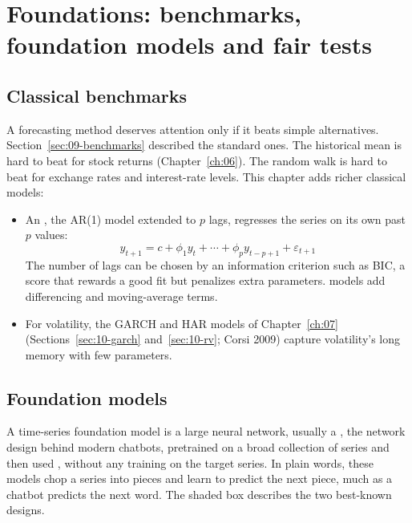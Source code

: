 \section{Foundations: benchmarks, foundation models and fair tests}
\label{sec:21-foundations}

\subsection{Classical benchmarks}

A forecasting method deserves attention only if it beats simple alternatives. Section~\ref{sec:09-benchmarks} described the standard ones. The historical mean is hard to beat for stock returns (Chapter~\ref{ch:06}). The random walk is hard to beat for exchange rates and interest-rate levels. This chapter adds richer classical models:
\begin{itemize}
  \item An , the AR(1) model extended to $p$ lags, regresses the series on its own past $p$ values:
  \begin{equation}
    y_{t+1} = c + \phi_1 y_t + \cdots + \phi_p y_{t-p+1} + \varepsilon_{t+1}
    \label{eq:21-ar}
  \end{equation}
  The number of lags can be chosen by an information criterion such as BIC, a score that rewards a good fit but penalizes extra parameters.  models add differencing and moving-average terms.
  \item For volatility, the GARCH and HAR models of Chapter~\ref{ch:07} (Sections~\ref{sec:10-garch} and~\ref{sec:10-rv}; Corsi 2009) capture volatility's long memory with few parameters.
\end{itemize}

\subsection{Foundation models}
\label{sec:21-fm}

A time-series foundation model is a large neural network, usually a , the network design behind modern chatbots, pretrained on a broad collection of series and then used , without any training on the target series. In plain words, these models chop a series into pieces and learn to predict the next piece, much as a chatbot predicts the next word. The shaded box describes the two best-known designs.

